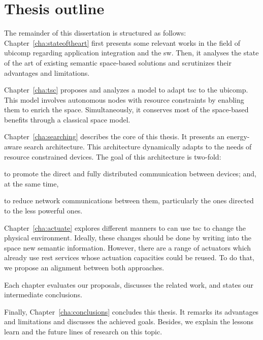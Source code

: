 \section{Thesis outline}
\label{sec:Outline}


The remainder of this dissertation is structured as follows:
Chapter~\ref{cha:stateoftheart} first presents some relevant works in the field of \acl{ubicomp} regarding application integration and the \acl{sw}. %
Then, it analyses the state of the art of existing semantic space-based solutions and scrutinizes their advantages and limitations.

Chapter~\ref{cha:tsc} proposes and analyzes a model to adapt \ac{tsc} to the \ac{ubicomp}.
This model involves autonomous nodes with resource constraints by enabling them to enrich the space.
Simultaneously, it conserves most of the space-based benefits through a classical space model.

Chapter~\ref{cha:searching} describes the core of this thesis.
It presents an energy-aware search architecture.
This architecture dynamically adapts to the needs of resource constrained devices.
The goal of this architecture is two-fold:
\begin{enumerate*}[label=\itshape\alph*\upshape)]
\item to promote the direct and fully distributed communication between devices;
and, at the same time,
\item to reduce network communications between them, particularly the ones directed to the less powerful ones.
\end{enumerate*}

Chapter~\ref{cha:actuate} explores different manners to can use \ac{tsc} to change the physical environment.
Ideally, these changes should be done by writing into the space new semantic information. %
However, there are a range of actuators which already use \ac{rest} services whose actuation capacities could be reused.
To do that, we propose an alignment between both approaches. %


Each chapter evaluates our proposals, discusses the related work, and states our intermediate conclusions. %

Finally, Chapter~\ref{cha:conclusions} concludes this thesis.
It remarks its advantages and limitations and discusses the achieved goals.
Besides, we explain the lessons learn and the future lines of research on this topic. %